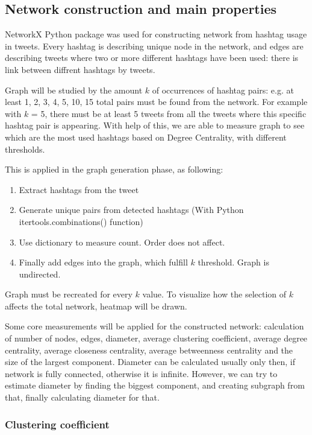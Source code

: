 \subsection{Network construction and main properties}

NetworkX Python package was used for constructing network from hashtag usage in tweets.
Every hashtag is describing unique node in the network, and edges are describing tweets where two or more different hashtags have been used: there is link between diffrent hashtags by tweets.

Graph will be studied by the amount $k$ of occurrences of hashtag pairs: e.g. at least 1, 2, 3, 4, 5, 10, 15 total pairs must be found from the network.
For example with $k$ = 5, there must be at least 5 tweets from all the tweets where this specific hashtag pair is appearing.
With help of this, we are able to measure graph to see which are the most used hashtags based on Degree Centrality, with different thresholds.

This is applied in the graph generation phase, as following:

\begin{enumerate}
    \item Extract hashtags from the tweet
    \item Generate unique pairs from detected hashtags (With Python itertools.combinations() function)
    \item Use dictionary to measure count. Order does not affect.
    \item Finally add edges into the graph, which fulfill $k$ threshold. Graph is undirected.
\end{enumerate}

Graph must be recreated for every $k$ value. To visualize how the selection of $k$ affects the total network, heatmap will be drawn.

Some core measurements will be applied for the constructed network: calculation of number of nodes, edges, diameter,
average clustering coefficient, average degree centrality, average closeness centrality, average betweenness centrality and the size of the largest component.
Diameter can be calculated usually only then, if network is fully connected, otherwise it is infinite.
However, we can try to estimate diameter by finding the biggest component, and creating subgraph from that, finally calculating diameter for that.



\subsubsection{Clustering coefficient}

